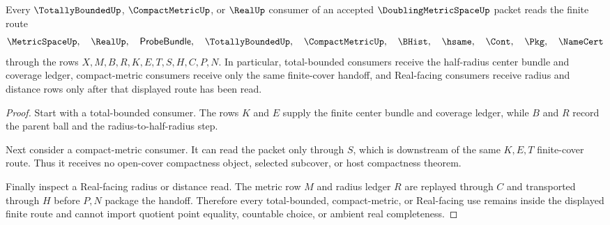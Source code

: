\begin{theorem}
\label{thm:doubling-metric-space-total-bounded-handoff}
Every $\TotallyBoundedUp$, $\CompactMetricUp$, or $\RealUp$ consumer of an accepted $\DoublingMetricSpaceUp$ packet reads the finite route
$$
\MetricSpaceUp,\quad \RealUp,\quad \mathsf{ProbeBundle},\quad \TotallyBoundedUp,\quad \CompactMetricUp,\quad \BHist,\quad \hsame,\quad \Cont,\quad \Pkg,\quad \NameCert
$$
through the rows $X,M,B,R,K,E,T,S,H,C,P,N$. In particular, total-bounded consumers receive the half-radius center bundle and coverage ledger, compact-metric consumers receive only the same finite-cover handoff, and Real-facing consumers receive radius and distance rows only after that displayed route has been read.
\end{theorem}
\begin{proof}
Start with a total-bounded consumer. The rows $K$ and $E$ supply the finite center bundle and coverage ledger, while $B$ and $R$ record the parent ball and the radius-to-half-radius step.

Next consider a compact-metric consumer. It can read the packet only through $S$, which is downstream of the same $K,E,T$ finite-cover route. Thus it receives no open-cover compactness object, selected subcover, or host compactness theorem.

Finally inspect a Real-facing radius or distance read. The metric row $M$ and radius ledger $R$ are replayed through $C$ and transported through $H$ before $P,N$ package the handoff. Therefore every total-bounded, compact-metric, or Real-facing use remains inside the displayed finite route and cannot import quotient point equality, countable choice, or ambient real completeness.
\end{proof}



